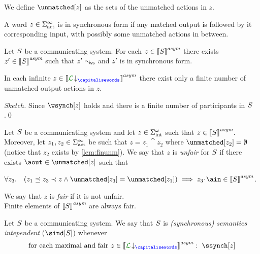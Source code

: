 We define $\unmatched[z]$ as the sets of the unmatched actions in $z$. 

A word $z\in\Sigma_{\text{act}}^\infty$ is in synchronous form if any matched output is followed by
it corresponding input, with possibly some unmatched actions in between.

\begin{lemma}
Let $S$ be a communicating system. For each $z\in{\llbracket S\rrbracket}^{\textit{asym}}$ there exists
$z'\in{\llbracket S\rrbracket}^{\textit{asym}}$ such that $z'\sim_{\!\mathsf{ws}}$ and $z'$ is in synchronous form. 
\end{lemma}

\begin{lemma}
\label{lem:finunm}
In each infinite $z\in \asem{\proj{\clang}{}}$ there exist only a finite number of unmatched output
actions in $z$. 
\end{lemma}
\begin{proof}[Sketch] Since $\wsynch[z]$ holds and
there is a finite number of participants in $S$.\qed
\end{proof}

\begin{definition}
Let $S$ be a communicating system and let $z\in\Sigma_{\text{int}}^\omega$ such that $z\in{\llbracket S\rrbracket}^{\textit{asym}}$.
Moreover, let $z_1, z_2\in\Sigma_{\text{act}}^\infty$ be such that $z=z_1\cat z_2$ where $\unmatched[z_2]=\emptyset$
(notice that $z_2$ exists by  \cref{lem:finunm}).
We say that $z$ is {\em unfair} for $S$ if there exists 
$\aout\in\unmatched[z]$ such that\\
\centerline{
$\forall z_3.\quad (z_1\preceq z_3\prec z \land \unmatched[z_3]=\unmatched[z_1])  \implies z_3\cat\ain\in\asem{\aCS}$.} 
We say that $z$ is {\em fair} if it is not unfair. \\
Finite elements of  ${\llbracket S \rrbracket}^{\textit{asym}}$ are always fair.
\end{definition}


\begin{definition}
\label{def:semind}
Let $S$ be a communicating system. We say that $S$ is {\em (synchronous) semantics intependent}
 ($\sind[\aCS]$) whenever
 $$\text{for each maximal and fair } z\in \asem{\proj{\clang}{}}:\  \ssynch[z]$$ 
\end{definition}







